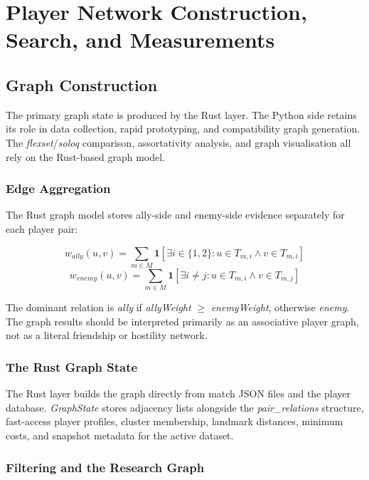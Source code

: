 \chapter{Player Network Construction, Search, and Measurements}

\section{Graph Construction}

The primary graph state is produced by the Rust layer. The Python side retains its role in data collection, rapid prototyping, and compatibility graph generation. The \textit{flexset}/\textit{soloq} comparison, assortativity analysis, and graph visualisation all rely on the Rust-based graph model.

\subsection{Edge Aggregation}

The Rust graph model stores ally-side and enemy-side evidence separately for each player pair:

\begin{equation}
w_{ally}(u,v)=\sum_{m \in M}\mathbf{1}[\exists i \in \{1,2\}: u \in T_{m,i} \land v \in T_{m,i}]
\end{equation}
\begin{equation}
w_{enemy}(u,v)=\sum_{m \in M}\mathbf{1}[\exists i \neq j: u \in T_{m,i} \land v \in T_{m,j}]
\end{equation}

The dominant relation is \textit{ally} if \textit{allyWeight} $\geq$ \textit{enemyWeight}, otherwise \textit{enemy}. The graph results should be interpreted primarily as an associative player graph, not as a literal friendship or hostility network.

\subsection{The Rust Graph State}

The Rust layer builds the graph directly from match JSON files and the player database. \textit{GraphState} stores adjacency lists alongside the \textit{pair\_relations} structure, fast-access player profiles, cluster membership, landmark distances, minimum costs, and snapshot metadata for the active dataset.

\subsection{Filtering and the Research Graph}

